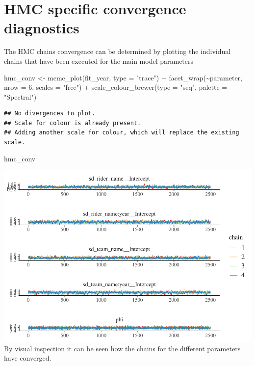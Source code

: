 \documentclass[
]{article}
\newenvironment{Shaded}{\begin{snugshade}}{\end{snugshade}}
\newcommand{\AttributeTok}[1]{\textcolor[rgb]{0.77,0.63,0.00}{#1}}
\newcommand{\DecValTok}[1]{\textcolor[rgb]{0.00,0.00,0.81}{#1}}
\newcommand{\FunctionTok}[1]{\textcolor[rgb]{0.00,0.00,0.00}{#1}}
\newcommand{\NormalTok}[1]{#1}
\newcommand{\OtherTok}[1]{\textcolor[rgb]{0.56,0.35,0.01}{#1}}
\newcommand{\SpecialCharTok}[1]{\textcolor[rgb]{0.00,0.00,0.00}{#1}}
\newcommand{\StringTok}[1]{\textcolor[rgb]{0.31,0.60,0.02}{#1}}
\begin{document}
\hypertarget{hmc-specific-convergence-diagnostics}{%
\section{HMC specific convergence
diagnostics}\label{hmc-specific-convergence-diagnostics}}

The HMC chains convergence can be determined by plotting the individual
chains that have been executed for the main model parameters

\begin{Shaded}
\begin{Highlighting}[]
\NormalTok{hmc\_conv }\OtherTok{\textless{}{-}} \FunctionTok{mcmc\_plot}\NormalTok{(fit\_year, }\AttributeTok{type =} \StringTok{"trace"}\NormalTok{) }\SpecialCharTok{+}
            \FunctionTok{facet\_wrap}\NormalTok{(}\SpecialCharTok{\textasciitilde{}}\NormalTok{parameter, }\AttributeTok{nrow =} \DecValTok{6}\NormalTok{, }\AttributeTok{scales =} \StringTok{"free"}\NormalTok{) }\SpecialCharTok{+}
            \FunctionTok{scale\_colour\_brewer}\NormalTok{(}\AttributeTok{type =} \StringTok{"seq"}\NormalTok{, }\AttributeTok{palette =} \StringTok{"Spectral"}\NormalTok{)}
\end{Highlighting}
\end{Shaded}

\begin{verbatim}
## No divergences to plot.
## Scale for colour is already present.
## Adding another scale for colour, which will replace the existing scale.
\end{verbatim}

\begin{Shaded}
\begin{Highlighting}[]
\NormalTok{hmc\_conv}
\end{Highlighting}
\end{Shaded}

\includegraphics{Project_files/figure-latex/unnamed-chunk-11-1.pdf} By
visual inspection it can be seen how the chains for the different
parameters have converged.
\end{document}

